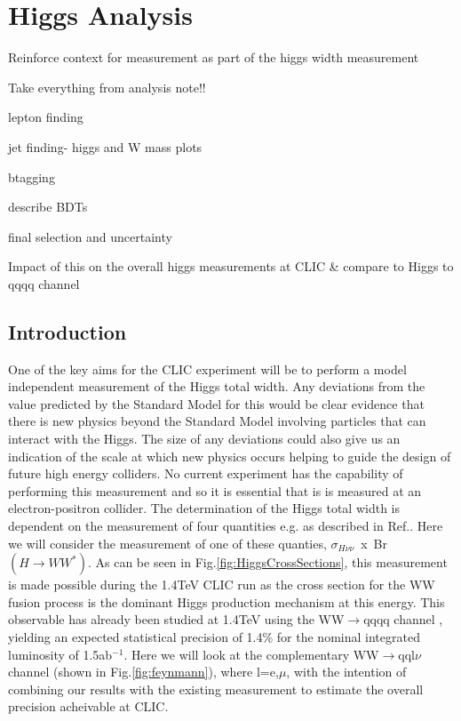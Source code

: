 \chapter{Higgs Analysis}

Reinforce context for measurement as part of the higgs width measurement

Take everything from analysis note!!

lepton finding

jet finding- higgs and W mass plots

btagging

describe BDTs

final selection and uncertainty

Impact of this on the overall higgs measurements at CLIC \& compare to Higgs to qqqq channel

\section{Introduction}
One of the key aims for the CLIC experiment will be to perform a model independent measurement of the Higgs total width. Any deviations from the value predicted by the Standard Model for this would be clear evidence that there is new physics beyond the Standard Model involving particles that can interact with the Higgs. The size of any deviations could also give us an indication of the scale at which new physics occurs helping to guide the design of future high energy colliders. No current experiment has the capability of performing this measurement and so it is essential that is is measured at an electron-positron collider. The determination of the Higgs total width is dependent on the measurement of four quantities e.g. as described in Ref.\cite{Durig:2014lfa}. Here we will consider the measurement of one of these quanties, $\sigma_{H\nu\nu}$~x~Br$(H\rightarrow WW^*)$. As can be seen in Fig.\ref{fig:HiggsCrossSections}, this measurement is made possible during the 1.4TeV CLIC run as the cross section for the WW fusion process is the dominant Higgs production mechanism at this energy. This observable has already been studied at 1.4TeV using the WW$\rightarrow$qqqq channel \cite{Pandurovic:2011508}, yielding an expected statistical precision of 1.4\% for the nominal integrated luminosity of 1.5ab$^{-1}$. Here we will look at the complementary WW$\rightarrow$qql$\nu$ channel (shown in Fig.\ref{fig:feynmann}), where l=e,$\mu$, with the intention of combining our results with the existing measurement to estimate the overall precision acheivable at CLIC. 


